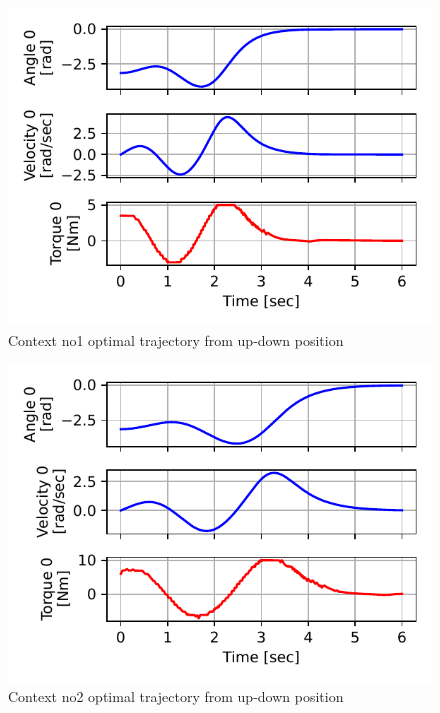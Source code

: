 \newpage
\begin{figure}[p]
\begin{center}
\includegraphics[width=0.99\linewidth]{fig/c1_traj.pdf}
\caption{Context no1 optimal trajectory from up-down position}\label{fig:c1_traj}
\end{center}
\end{figure}


\begin{figure}[p]
\begin{center}
\includegraphics[width=0.99\linewidth]{fig/c2_traj.pdf}
\caption{Context no2 optimal trajectory from up-down position}\label{fig:c2_traj}
\end{center}
\end{figure}

